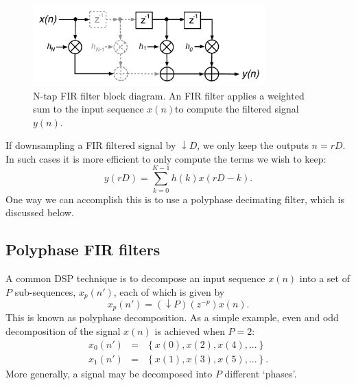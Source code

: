 \documentclass{ws-rv961x669}
\begin{document}
\begin{figure}
 \centering
 \includegraphics[width=0.8\textwidth]{./figures/fir_filter}
 
 \caption{N-tap FIR filter block diagram. An FIR filter applies a weighted sum to the input sequence $x(n)$to compute the filtered signal $y(n)$. \label{fig:fir}}
\end{figure}

If downsampling a FIR filtered signal by $\downarrow D$, we only keep the outputs $n=rD$. %
In such cases it is more efficient to only compute the terms we wish to keep: 
\begin{equation}
y(rD)=\sum_{k=0}^{K-1}h(k)x(rD-k).\label{eq:FIR-filter-decimated}
\end{equation}
One way we can accomplish this is to use a polyphase decimating filter, which is discussed below. 



\subsection{Polyphase FIR filters}\label{sub:pfir}

A common DSP technique is to decompose an input sequence $x(n)$ into a set
of $P$ sub-sequences, $x_{p}(n')$, each of which is given by 
\begin{equation}
x_{p}(n')=(\downarrow P)(z^{-p})x(n).
\end{equation}
This is known as polyphase decomposition\cite{Vaidyanathan:1990p6127}. As a simple example, even and odd decomposition of the signal $x(n)$ is achieved when $P=\mbox{2}$:
\begin{eqnarray}
x_{0}(n') & = & \left\{ x(0),x(2),x(4),...\right\} \\
x_{1}(n') & = & \left\{ x(1),x(3),x(5),...\right\} .
\end{eqnarray}
More generally, a signal may be decomposed into $P$ different `phases'.
\end{document}
